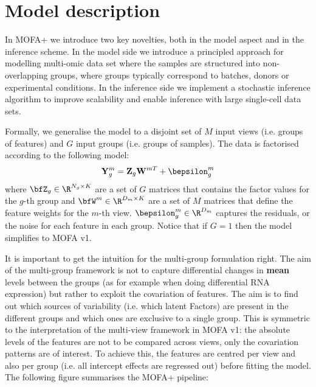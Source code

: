 \graphicspath{{Chapter4/Figs/simulations/}{Chapter4/Figs/scrna/}{Chapter4/Figs/scmet/}{Chapter4/Figs/scnmt/}}

\section{Model description}

In MOFA+ we introduce two key novelties, both in the model aspect and in the inference scheme. In the model side we introduce a principled approach for modelling multi-omic data set where the samples are structured into non-overlapping groups, where groups typically correspond to batches, donors or experimental conditions. In the inference side we implement a stochastic inference algorithm to improve scalability and enable inference with large single-cell data sets.

Formally, we generalise the model to a disjoint set of $M$ input views (i.e. groups of features) and $G$ input groups (i.e. groups of samples). The data is factorised according to the following model:
\begin{equation} \label{mofa_master_equation}
	\mathbf{Y}^{m}_{g} = \mathbf{Z}_{g} \mathbf{W}^{mT} + \bepsilon^{m}_{g}
\end{equation}
where $\bfZ_{g} \in \R^{N_{g} \times K}$ are a set of $G$ matrices that contains the factor values for the $g$-th group and $\bfW^{m} \in \R^{D_m \times K}$ are a set of $M$ matrices that define the feature weights for the $m$-th view. $\bepsilon^{m}_{g} \in \R^{D_m}$ captures the residuals, or the noise for each feature in each group. Notice that if $G=1$ then the model simplifies to MOFA v1. 

It is important to get the intuition for the multi-group formulation right. The aim of the multi-group framework is not to capture differential changes in \textbf{mean} levels between the groups (as for example when doing differential RNA expression) but rather to exploit the covariation of features. The aim is to find out which sources of variability (i.e. which latent Factors) are present in the different groups and which ones are exclusive to a single group. This is symmetric to the interpretation of the multi-view framework in MOFA v1: the absolute levels of the features are not to be compared across views, only the covariation patterns are of interest. To achieve this, the features are centred per view and also per group (i.e. all intercept effects are regressed out) before fitting the model. The following figure summarises the MOFA+ pipeline:

